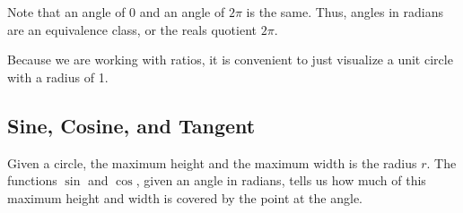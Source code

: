 \documentclass[12pt]{article}
\begin{document}
Note that an angle of 0 and an angle of \( 2\pi \) is the same.
Thus, angles in radians are an equivalence class, or the reals quotient \( 2\pi \).

Because we are working with ratios,
it is convenient to just visualize a unit circle with a radius of 1.

\subsection{Sine, Cosine, and Tangent}

Given a circle, the maximum height and the maximum width is the radius \( r \).
The functions \( \sin \) and \( \cos \),
given an angle in radians,
tells us how much of this maximum height and width is covered by the point at the angle.

\end{document}
